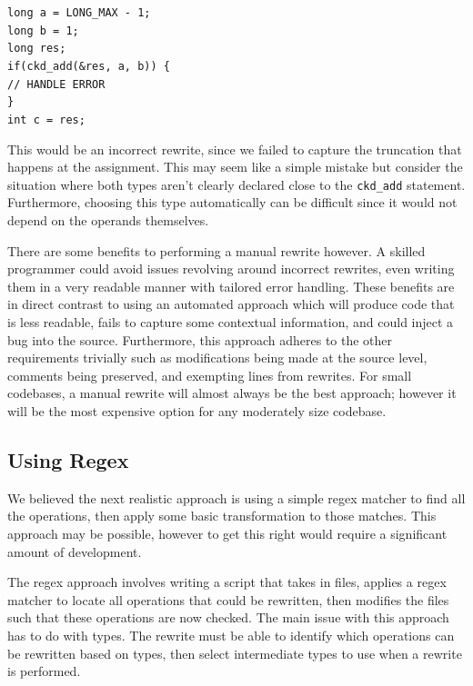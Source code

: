 \begin{flushleft}
\begin{minipage}{\linewidth}
\texttt{long a = LONG\_MAX - 1;\\
long b = 1;\\
long res;\\
if(ckd\_add(&res, a, b)) \{\\
// HANDLE ERROR\\
\}\\
int c = res;
}
\end{minipage}
\end{flushleft}

This would be an incorrect rewrite, since we failed to capture the truncation that happens at the assignment. This may seem like a simple mistake but consider the situation where both types aren't clearly declared close to the \texttt{ckd\_add} statement. Furthermore, choosing this type automatically can be difficult since it would not depend on the operands themselves.

There are some benefits to performing a manual rewrite however. A skilled programmer could avoid issues revolving around incorrect rewrites, even writing them in a very readable manner with tailored error handling. These benefits are in direct contrast to using an automated approach which will produce code that is less readable, fails to capture some contextual information, and could inject a bug into the source. Furthermore, this approach adheres to the other requirements trivially such as modifications being made at the source level, comments being preserved, and exempting lines from rewrites. For small codebases, a manual rewrite will almost always be the best approach; however it will be the most expensive option for any moderately size codebase. 

\subsection{Using Regex}

We believed the next realistic approach is using a simple regex matcher to find all the operations, then apply some basic transformation to those matches. This approach may be possible, however to get this right would require a significant amount of development.

The regex approach involves writing a script that takes in files, applies a regex matcher to locate all operations that could be rewritten, then modifies the files such that these operations are now checked. The main issue with this approach has to do with types. The rewrite must be able to identify which operations can be rewritten based on types, then select intermediate types to use when a rewrite is performed.

